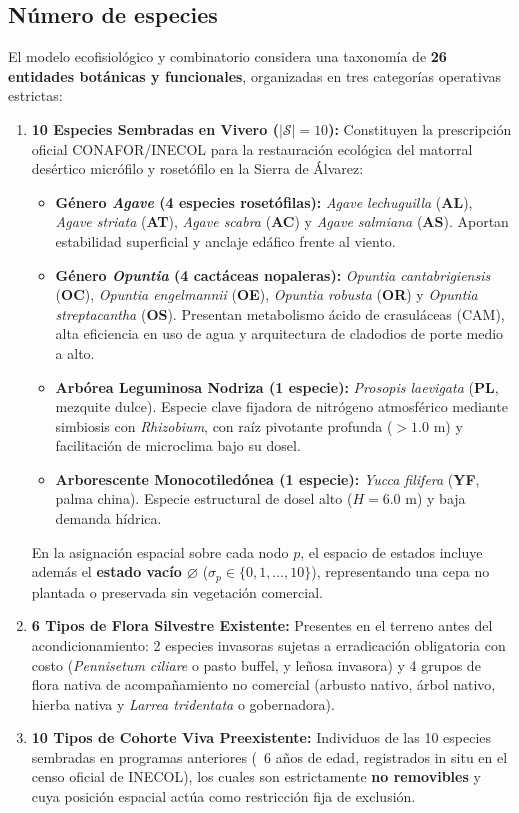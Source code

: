 \documentclass[11pt,a4paper]{article}
\begin{document}
\subsection{Número de especies}
El modelo ecofisiológico y combinatorio considera una taxonomía de \textbf{26 entidades botánicas y funcionales}, organizadas en tres categorías operativas estrictas:
\begin{enumerate}[leftmargin=1.5em]
    \item \textbf{10 Especies Sembradas en Vivero ($|\mathcal{S}| = 10$):} Constituyen la prescripción oficial CONAFOR/INECOL para la restauración ecológica del matorral desértico micrófilo y rosetófilo en la Sierra de Álvarez:
    \begin{itemize}
        \item \textbf{Género \textit{Agave} (4 especies rosetófilas):} \textit{Agave lechuguilla} (\textbf{AL}), \textit{Agave striata} (\textbf{AT}), \textit{Agave scabra} (\textbf{AC}) y \textit{Agave salmiana} (\textbf{AS}). Aportan estabilidad superficial y anclaje edáfico frente al viento.
        \item \textbf{Género \textit{Opuntia} (4 cactáceas nopaleras):} \textit{Opuntia cantabrigiensis} (\textbf{OC}), \textit{Opuntia engelmannii} (\textbf{OE}), \textit{Opuntia robusta} (\textbf{OR}) y \textit{Opuntia streptacantha} (\textbf{OS}). Presentan metabolismo ácido de crasuláceas (CAM), alta eficiencia en uso de agua y arquitectura de cladodios de porte medio a alto.
        \item \textbf{Arbórea Leguminosa Nodriza (1 especie):} \textit{Prosopis laevigata} (\textbf{PL}, mezquite dulce). Especie clave fijadora de nitrógeno atmosférico mediante simbiosis con \textit{Rhizobium}, con raíz pivotante profunda ($> 1.0\text{ m}$) y facilitación de microclima bajo su dosel.
        \item \textbf{Arborescente Monocotiledónea (1 especie):} \textit{Yucca filifera} (\textbf{YF}, palma china). Especie estructural de dosel alto ($H = 6.0\text{ m}$) y baja demanda hídrica.
    \end{itemize}
    En la asignación espacial sobre cada nodo $p$, el espacio de estados incluye además el \textbf{estado vacío $\boldsymbol{\varnothing}$} ($\sigma_p \in \{0, 1, \dots, 10\}$), representando una cepa no plantada o preservada sin vegetación comercial.
    \item \textbf{6 Tipos de Flora Silvestre Existente:} Presentes en el terreno antes del acondicionamiento: 2 especies invasoras sujetas a erradicación obligatoria con costo (\textit{Pennisetum ciliare} o pasto buffel, y leñosa invasora) y 4 grupos de flora nativa de acompañamiento no comercial (arbusto nativo, árbol nativo, hierba nativa y \textit{Larrea tridentata} o gobernadora).
    \item \textbf{10 Tipos de Cohorte Viva Preexistente:} Individuos de las 10 especies sembradas en programas anteriores (~6 años de edad, registrados in situ en el censo oficial de INECOL), los cuales son estrictamente \textbf{no removibles} y cuya posición espacial actúa como restricción fija de exclusión.
\end{enumerate}
\end{document}
